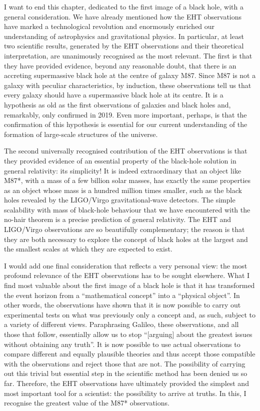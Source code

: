 I want to end this chapter, dedicated to the first image of a black hole, with a general
consideration. We have already mentioned how the EHT observations have marked a
technological revolution and enormously enriched our understanding of astrophysics and
gravitational physics. In particular, at least two scientific results, generated by the
EHT observations and their theoretical interpretation, are unanimously recognised as the
most relevant. The first is that they have provided evidence, beyond any reasonable
doubt, that there is an accreting supermassive black hole at the centre of galaxy M87.
Since M87 is not a galaxy with peculiar characteristics, by induction, these
observations tell us that every galaxy should have a supermassive black hole at its
centre. It is a hypothesis as old as the first observations of galaxies and black holes
and, remarkably, only confirmed in 2019. Even more important, perhaps, is that the
confirmation of this hypothesis is essential for our current understanding of the
formation of large-scale structures of the universe.

The second universally recognised contribution of the EHT observations is that they
provided evidence of an essential property of the black-hole solution in general
relativity: its simplicity! It is indeed extraordinary that an object like
M87*, with a mass of a few billion solar masses, has exactly the same
properties as an object whose mass is a hundred million times smaller, such as the black
holes revealed by the LIGO/Virgo
gravitational-wave detectors. The simple scalability with mass of
black-hole behaviour that we have encountered with the no-hair theorem is a precise
prediction of general relativity. The EHT and LIGO/Virgo observations are so beautifully
complementary; the reason is that they are both necessary to explore the concept of
black holes at the largest and the smallest scales at which they are expected to exist.

I would add one final consideration that reflects a very personal view: the most
profound relevance of the EHT observations has to be sought elsewhere. What I find most
valuable about the first image of a black hole is that it has transformed the event
horizon from a ``mathematical concept'' into a ``physical object''.
In other words, the observations have shown that it is now possible to carry out
experimental tests on what was previously only a concept and, as such, subject to a
variety of different views. Paraphrasing Galileo, these observations, and all those that
follow, essentially allow us to stop ``{[}arguing{]} about the greatest issues without
obtaining any truth''. It is now possible to use actual observations to compare
different and equally plausible theories and thus accept those compatible with the
observations and reject those that are not. The possibility of carrying out this trivial
but essential step in the scientific method has been denied us so
far. Therefore, the EHT observations have ultimately provided the simplest and most
important tool for a scientist: the possibility to arrive at truths. In this, I
recognise the greatest value of the M87* observations.
